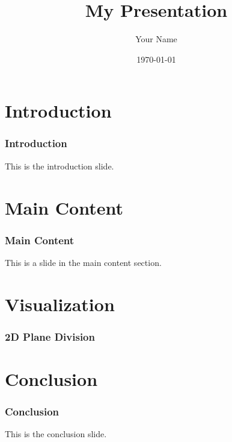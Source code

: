 \documentclass[aspectratio=169]{beamer}
\title{My Presentation}
\author{Your Name}
\date{\today}
\begin{document}
\begin{frame}
\titlepage
\end{frame}

\section{Introduction}
\begin{frame}
\frametitle{Introduction}
This is the introduction slide.
\end{frame}

\section{Main Content}
\begin{frame}
\frametitle{Main Content}
This is a slide in the main content section.
\end{frame}

\section{Visualization}
\begin{frame}
\frametitle{2D Plane Division}
\begin{center}
\end{center}
\end{frame}

\section{Conclusion}
\begin{frame}
\frametitle{Conclusion}
This is the conclusion slide.
\end{frame}
\end{document}
